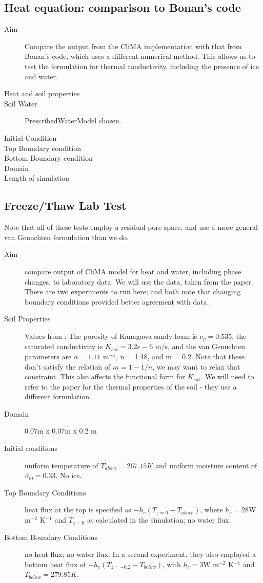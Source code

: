 \documentclass[twoside,10pt]{report}
\begin{document}
\subsection{Heat equation: comparison to Bonan's code}
\begin{description}
\item [Aim] Compare the output from the CliMA implementation with that from Bonan's code, which uses a different numerical method.  This allows us to test the formulation for thermal conductivity, including the presence of ice and water.
\item [Heat and soil properties]
\item [Soil Water] PrescribedWaterModel chosen. 
\item [Initial Condition] 
\item [Top Boundary condition] 
\item [Bottom Boundary condition]
\item [Domain] 
\item [Length of simulation]
\end{description}

\subsection{Freeze/Thaw Lab Test}
Note that all of these tests employ a residual pore space, and use a more general van Genuchten formulation than we do.
\begin{description}
\item [Aim] compare output of CliMA model for heat and water, including phase changes, to laboratory data. We will use the \citet{Mizoguchi1990} data, taken from the \citet{Hansson04a} paper. There are two experiments to run here; \citet{Painter2011} and \citet{Hansson04a} both note that changing boundary conditions provided better agreement with data.
\item [ Soil Properties ] Values from \citet{Hansson04a}: The porosity of Kanagawa sandy loam is $\nu_p = 0.535$, the saturated conductivity is $K_{sat} = 3.2e-6$ m/s, and the van Genuchten parameters are $\alpha = 1.11$ m$^{-1}$, n = 1.48, and m = 0.2. Note that these don't satisfy the relation of $m = 1- 1/n$, we may want to relax that constraint. This also affects the functional form for $K_{sat}$. We will need to refer to the \citet{Hansson04a} paper for the thermal properties of the soil - they use a different formulation.
\item [ Domain] 0.07m x 0.07m x 0.2 m
\item [ Initial conditions] uniform temperature of $T_{above} = 267.15K$ and uniform moisture content of $\vartheta_{l0} = 0.33$. No ice.
\item [ Top Boundary Conditions ] heat flux at the top is specified as $-h_c(T_{z=0}- T_{above})$, where $h_c = 28 $W m$^{-2}$ K$^{-1}$ and $T_{z=0}$ as calculated in the simulation; no water flux.
\item [ Bottom Boundary Conditions ] no heat flux; no water flux. In a second experiment, they also employed a bottom heat flux of $-h_c(T_{z=-0.2}- T_{below})$, with $h_c = 3$W m$^{-2}$ K$^{-1}$ and $T_{below} = 279.85K$.
\end{description}
\end{document}
